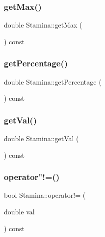 \mbox{\label{classStamina_a2058ea4b530bc666a7ac69fc4549c9fc_a2058ea4b530bc666a7ac69fc4549c9fc}} 
\subsubsection{\texorpdfstring{get\+Max()}{getMax()}}
{\footnotesize\ttfamily double Stamina\+::get\+Max (\begin{DoxyParamCaption}{ }\end{DoxyParamCaption}) const}

\mbox{\label{classStamina_ae828f2e015de23a14150769c0b6c91a6_ae828f2e015de23a14150769c0b6c91a6}} 
\subsubsection{\texorpdfstring{get\+Percentage()}{getPercentage()}}
{\footnotesize\ttfamily double Stamina\+::get\+Percentage (\begin{DoxyParamCaption}{ }\end{DoxyParamCaption}) const}

\mbox{\label{classStamina_a57bbd8b3071fe52521ddfb084a2c2694_a57bbd8b3071fe52521ddfb084a2c2694}} 
\subsubsection{\texorpdfstring{get\+Val()}{getVal()}}
{\footnotesize\ttfamily double Stamina\+::get\+Val (\begin{DoxyParamCaption}{ }\end{DoxyParamCaption}) const}

\mbox{\label{classStamina_aa8bbeed4d64bf1645b3eeb544bdd2c6a_aa8bbeed4d64bf1645b3eeb544bdd2c6a}} 
\subsubsection{\texorpdfstring{operator"!=()}{operator!=()}}
{\footnotesize\ttfamily bool Stamina\+::operator!= (\begin{DoxyParamCaption}\item[{double}]{val }\end{DoxyParamCaption}) const}

